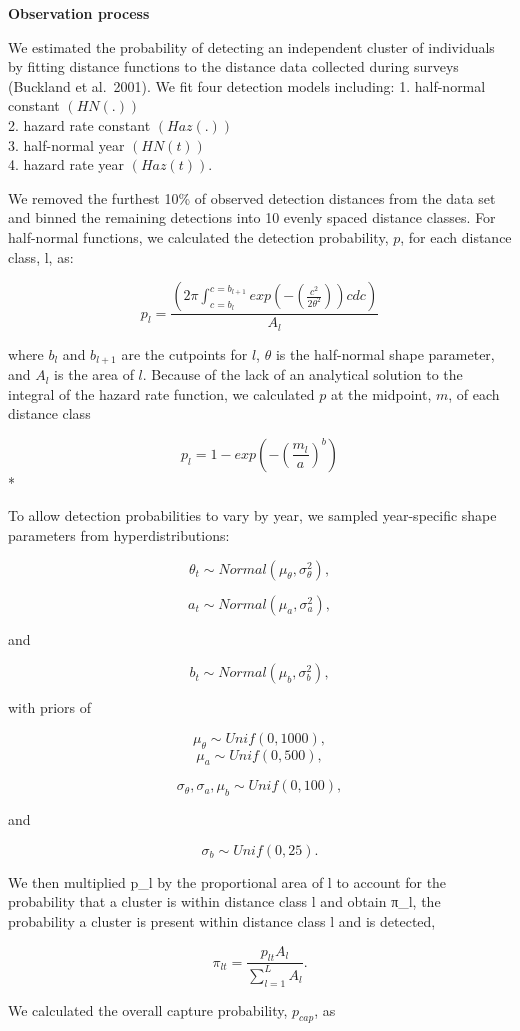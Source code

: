 \documentclass[
  letterpaper,
  DIV=11,
  numbers=noendperiod,
  oneside]{scrreprt}
\begin{document}
\textbf{Observation process}

We estimated the probability of detecting an independent cluster of
individuals by fitting distance functions to the distance data collected
during surveys (Buckland et al.~2001). We fit four detection models
including: 1. half-normal constant \((HN(.))\)\\
2. hazard rate constant \((Haz(.))\)\\
3. half-normal year \((HN(t))\)\\
4. hazard rate year \((Haz(t))\).

We removed the furthest 10\% of observed detection distances from the
data set and binned the remaining detections into 10 evenly spaced
distance classes. For half-normal functions, we calculated the detection
probability, \(p\), for each distance class, l, as:

\[p_{l} = \frac {(2π∫_{c=b_{l}}^{c=b_{l+1}}exp⁡(-(\frac {c^2}{2θ^2} ))c dc)}{A_l}\]

where \(b_{l}\) and \(b_{l+1}\) are the cutpoints for \(l\), \(θ\) is
the half-normal shape parameter, and \(A_{l}\) is the area of \(l\).
Because of the lack of an analytical solution to the integral of the
hazard rate function, we calculated \(p\) at the midpoint, \(m\), of
each distance class

\[p_{l} = 1-exp⁡ (-(\frac{ m_{l}}{a})^{b} )\]*

To allow detection probabilities to vary by year, we sampled
year-specific shape parameters from hyperdistributions:

\[θ_{t}\sim Normal(μ_{θ},σ_{θ}^{2} ),\]

\[a_{t}\sim Normal(μ_{a},σ_{a}^{2} ),\]

and

\[b_{t}\sim Normal(μ_{b},σ_{b}^{2} ),\]

with priors of

\[μ_{θ}\sim Unif(0,1000),\] \[μ_{a}\sim Unif(0,500),\]

\[σ_{θ},σ_{a},μ_{b}\sim Unif(0,100),\]

and

\[σ_{b}\sim Unif(0,25).\]

We then multiplied p\_l by the proportional area of l to account for the
probability that a cluster is within distance class l and obtain π\_l,
the probability a cluster is present within distance class l and is
detected,

\[π_{lt} = \frac {p_{lt} A_{l}}{∑_{l=1}^{L}A_{l}}.\]

We calculated the overall capture probability, \(p_{cap}\), as
\end{document}
